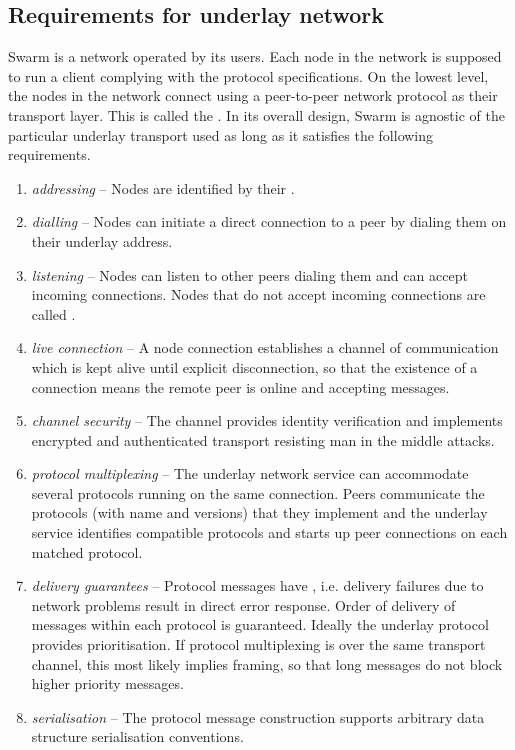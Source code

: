 \subsection{Requirements for underlay network \statusyellow}\label{sec:underlay-transport} 

\yellow{}

Swarm is a network operated by its users. Each node in the network is supposed to run a client complying with the protocol specifications. On the lowest level, the nodes in the network connect using a peer-to-peer network protocol as their transport layer. This is called the . 
In its overall design, Swarm is agnostic of the particular underlay transport used as long as it satisfies the following requirements.

\begin{enumerate}
    \item \emph{addressing} -- Nodes are identified by their .
    \item \emph{dialling} -- Nodes can initiate a direct connection to a peer by dialing them on their underlay address.
    \item \emph{listening} -- Nodes can listen to other peers dialing them and can accept incoming connections. Nodes that do not accept incoming connections are called .
    \item \emph{live connection} -- A node connection establishes a channel of communication which is kept alive until explicit disconnection, so that the existence of a connection means the remote peer is online and accepting messages.
    \item \emph{channel security} -- 
    The channel provides identity verification and implements encrypted and authenticated transport resisting man in the middle attacks.
    \item \emph{protocol multiplexing} -- 
    The underlay network service can accommodate several protocols running on the same connection. Peers communicate the protocols (with name and versions) that they implement and the underlay service identifies compatible protocols and starts up peer connections on each matched protocol. 
    \item \emph{delivery guarantees} -- 
    Protocol messages have , i.e. delivery failures due to network problems result in direct error response. 
    Order of delivery of messages within each protocol is guaranteed. 
    Ideally the underlay protocol provides prioritisation. 
    If protocol multiplexing is over the same transport channel, this most likely implies framing, so that long messages do not block higher priority messages.
    \item \emph{serialisation} -- 
    The protocol message construction supports arbitrary data structure serialisation conventions.
    
\end{enumerate}

